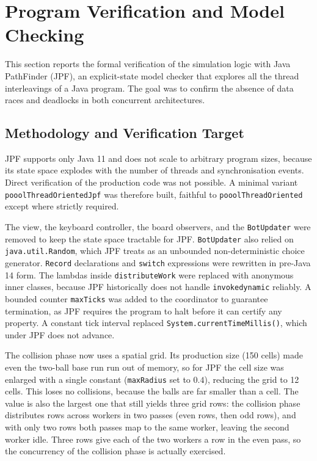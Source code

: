 \documentclass{scrartcl}
\begin{document}
\section{Program Verification and Model Checking}

This section reports the formal verification of the simulation logic with Java PathFinder (JPF), an explicit-state model checker that explores all the thread interleavings of a Java program. The goal was to confirm the absence of data races and deadlocks in both concurrent architectures.

\subsection{Methodology and Verification Target}

JPF supports only Java 11 and does not scale to arbitrary program sizes, because its state space explodes with the number of threads and synchronisation events. Direct verification of the production code was not possible. A minimal variant \texttt{pooolThreadOrientedJpf} was therefore built, faithful to \texttt{pooolThreadOriented} except where strictly required.

The view, the keyboard controller, the board observers, and the \texttt{BotUpdater} were removed to keep the state space tractable for JPF. \texttt{BotUpdater} also relied on \texttt{java.util.Random}, which JPF treats as an unbounded non-deterministic choice generator. \texttt{Record} declarations and \texttt{switch} expressions were rewritten in pre-Java 14 form. The lambdas inside \texttt{distributeWork} were replaced with anonymous inner classes, because JPF historically does not handle \texttt{invokedynamic} reliably. A bounded counter \texttt{maxTicks} was added to the coordinator to guarantee termination, as JPF requires the program to halt before it can certify any property. A constant tick interval replaced \texttt{System.currentTimeMillis()}, which under JPF does not advance.

The collision phase now uses a spatial grid. Its production size (150 cells) made even the two-ball base run run out of memory, so for JPF the cell size was enlarged with a single constant (\texttt{maxRadius} set to $0.4$), reducing the grid to 12 cells. This loses no collisions, because the balls are far smaller than a cell. The value is also the largest one that still yields three grid rows: the collision phase distributes rows across workers in two passes (even rows, then odd rows), and with only two rows both passes map to the same worker, leaving the second worker idle. Three rows give each of the two workers a row in the even pass, so the concurrency of the collision phase is actually exercised.
\end{document}
